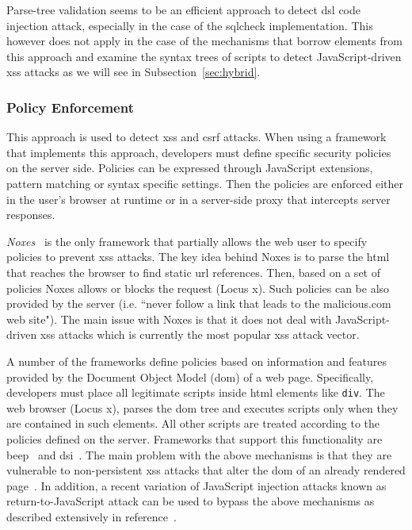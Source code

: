 \documentclass[conference]{IEEEtran}
\begin{document}
Parse-tree validation seems to be an efficient approach
to detect {\sc dsl} code injection attack,
especially in the case of the {\sc sql}check
implementation. This however does not apply in
the case of the mechanisms that borrow elements from
this approach and examine the syntax trees
of scripts to detect JavaScript-driven {\sc xss} attacks
as we will see in Subsection~\ref{sec:hybrid}.

\subsubsection{Policy Enforcement}
\label{sec:policy}

This approach is used to detect {\sc xss} and {\sc csrf} attacks.
When using a framework that implements
this approach, developers must define
specific security policies on the server side.
Policies can be expressed through JavaScript extensions,
pattern matching or syntax specific settings.
Then the policies are enforced either in the user's
browser at runtime or in a server-side proxy that intercepts
server responses.

{\it Noxes}~\cite{KKVJ06,KJKV09} is the only
framework that partially allows the web
user to specify policies to prevent {\sc xss} attacks.
The key idea behind Noxes is to parse
the {\sc html} that reaches the browser to
find static {\sc url} references. Then, based on
a set of policies Noxes allows or blocks
the request (Locus {\sc x}). Such policies
can be also provided by the server (i.e. ``never
follow a link that leads to the malicious.com
web site"). The main issue with Noxes is that
it does not deal with JavaScript-driven {\sc xss}
attacks which is currently the most popular
{\sc xss} attack vector.

A number of the frameworks define policies
based on information and features provided by
the Document Object Model ({\sc dom}) of a web page.
Specifically, developers must place all legitimate
scripts inside {\sc html} elements like {\tt div}.
The web browser (Locus {\sc x}), parses the
{\sc dom} tree and executes scripts only when they
are contained in such elements. All other scripts
are treated according to the policies defined
on the server. Frameworks that support this
functionality are {\sc beep}~\cite{TNH07}
and {\sc dsi}~\cite{NSS06}. The main problem with
the above mechanisms is that they are vulnerable
to non-persistent {\sc xss} attacks that alter
the {\sc dom} of an already rendered
page~\cite{APKLM10}.
In addition, a recent variation of JavaScript
injection attacks known as return-to-JavaScript
attack can be used to bypass the above mechanisms
as described extensively in reference~\cite{APKLM10}.
\end{document}
